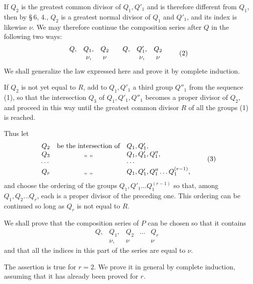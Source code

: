 \documentclass[11pt]{article}
\begin{document}
If $Q_2$ is the greatest common divisor of $Q_1,Q'_1$ and is therefore different from $Q_1$, then by \S\,6, 4., $Q_2$ is a greatest normal divisor of $Q_1$ and $Q'_1$, and its index is likewise $\nu$. We may therefore continue the composition series after $Q$ in the following two ways:
\begin{equation}
\begin{array}{ccc@{\qquad}ccc}
Q,&Q_1,&Q_2&Q,&Q'_1,&Q_2\\
&\nu,&\nu&&\nu,&\nu
\end{array}
\tag{2}
\end{equation}
We shall generalize the law expressed here and prove it by complete induction.

If $Q_2$ is not yet equal to $R$, add to $Q_1,Q'_1$ a third group $Q''_1$ from the sequence (1), so that the intersection $Q_3$ of $Q_1,Q'_1,Q''_1$ becomes a proper divisor of $Q_2$, and proceed in this way until the greatest common divisor $R$ of all the groups (1) is reached.

Thus let
\begin{equation}
\begin{array}{rcl}
Q_2&\hbox{be the intersection of}&Q_1,Q'_1,\\
Q_3&\hbox{ ,, ,, }&Q_1,Q'_1,Q''_1,\\
\cdots&&\cdots\\
Q_r&\hbox{ ,, ,, }&Q_1,Q'_1,Q''_1\ldots Q_1^{(r-1)},
\end{array}
\tag{3}
\end{equation}
and choose the ordering of the groups $Q_1,Q'_1\ldots Q_1^{(r-1)}$ so that, among $Q_1,Q_2\ldots Q_r$, each is a proper divisor of the preceding one. This ordering can be continued so long as $Q_r$ is not equal to $R$.

We shall prove that the composition series of $P$ can be chosen so that it contains
\begin{equation}
\begin{array}{ccccc}
Q,&Q_1,&Q_2&\ldots&Q_r\\
&\nu,&\nu&&\nu
\end{array}
\tag{4}
\end{equation}
and that all the indices in this part of the series are equal to $\nu$.

The assertion is true for $r=2$. We prove it in general by complete induction, assuming that it has already been proved for $r$.
\end{document}
